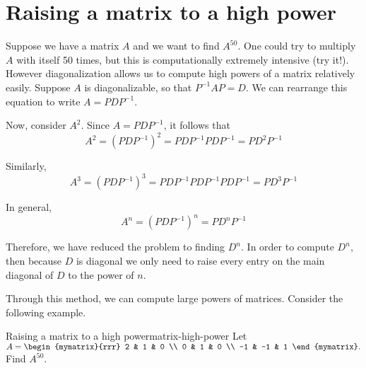 \section{Raising a matrix to a high power}

Suppose we have a matrix $A$ and we want to find $A^{50}$. One could
try to multiply $A$ with itself 50 times, but this is computationally
extremely intensive (try it!). However diagonalization allows us to
compute high powers of a matrix relatively easily.  Suppose $A$ is
diagonalizable, so that $P^{-1}AP=D$. We can rearrange this equation
to write $A=PDP^{-1}$.

Now, consider $A^{2}$. Since $A=PDP^{-1}$, it follows that 
\begin{equation*}
A^{2} = (PDP^{-1}) ^{2}=PDP^{-1}PDP^{-1}=PD^{2}P^{-1}
\end{equation*}

Similarly, 
\begin{equation*}
A^3 = (PDP^{-1}) ^{3}=PDP^{-1}PDP^{-1}PDP^{-1}=PD^{3}P^{-1}
\end{equation*}

In general,
\begin{equation*}
A^n = (PDP^{-1}) ^{n}=PD^{n}P^{-1}
\end{equation*}

Therefore, we have reduced the problem to finding $D^{n}$. In order to
compute $D^{n}$, then because $D$ is diagonal we only need to raise
every entry on the main diagonal of $D$ to the power of $n$.

Through this method, we can compute large powers of matrices. Consider the following example.

\begin{example}{Raising a matrix to a high power}{matrix-high-power}
Let
  $A=\begin{mymatrix}{rrr}
2 & 1 & 0 \\
0 & 1 & 0 \\
-1 & -1 & 1
\end{mymatrix}. $ Find $A^{50}$.
\end{example}

